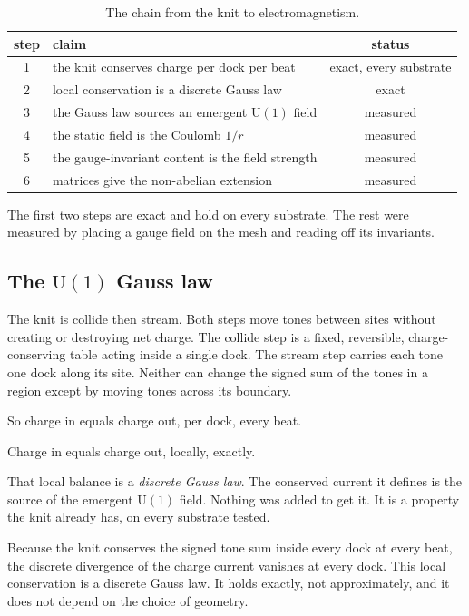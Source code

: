 \begin{table}[ht]
\centering
\begin{tabular}{@{}clc@{}}
\toprule
step & claim & status \\
\midrule
1 & the knit conserves charge per dock per beat & exact, every substrate \\
2 & local conservation is a discrete Gauss law & exact \\
3 & the Gauss law sources an emergent $\mathrm{U}(1)$ field & measured \\
4 & the static field is the Coulomb $1/r$ & measured \\
5 & the gauge-invariant content is the field strength & measured \\
6 & matrices give the non-abelian extension & measured \\
\bottomrule
\end{tabular}
\caption{The chain from the knit to electromagnetism.}
\label{tab:em-chain}
\end{table}

The first two steps are exact and hold on every substrate. The rest were measured by placing a gauge field on the mesh and reading off its invariants.

\subsection{The $\mathrm{U}(1)$ Gauss law}

The knit is collide then stream. Both steps move tones between sites without creating or destroying net charge. The collide step is a fixed, reversible, charge-conserving table acting inside a single dock. The stream step carries each tone one dock along its site. Neither can change the signed sum of the tones in a region except by moving tones across its boundary.

So charge in equals charge out, per dock, every beat.

\begin{principle}
Charge in equals charge out, locally, exactly.
\end{principle}

That local balance is a \emph{discrete Gauss law}. The conserved current it defines is the source of the emergent $\mathrm{U}(1)$ field. Nothing was added to get it. It is a property the knit already has, on every substrate tested.

\begin{theorem}
Because the knit conserves the signed tone sum inside every dock at every beat, the discrete divergence of the charge current vanishes at every dock. This local conservation is a discrete Gauss law. It holds exactly, not approximately, and it does not depend on the choice of geometry.
\end{theorem}


